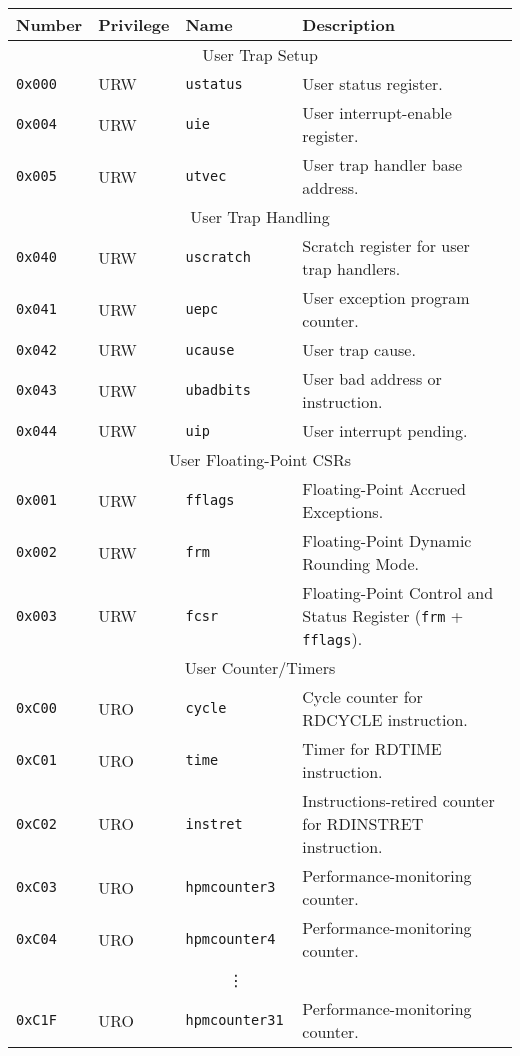 \begin{table}[htb!]
\begin{center}
\begin{tabular}{|l|l|l|l|}
\hline
Number    & Privilege & Name & Description \\
\hline
\multicolumn{4}{|c|}{User Trap Setup} \\
\hline
\tt 0x000 & URW  &\tt ustatus    & User status register. \\
\tt 0x004 & URW  &\tt uie        & User interrupt-enable register. \\
\tt 0x005 & URW  &\tt utvec      & User trap handler base address. \\
\hline
\multicolumn{4}{|c|}{User Trap Handling} \\
\hline
\tt 0x040 & URW  &\tt uscratch   & Scratch register for user trap handlers. \\
\tt 0x041 & URW  &\tt uepc       & User exception program counter. \\
\tt 0x042 & URW  &\tt ucause     & User trap cause. \\
\tt 0x043 & URW  &\tt ubadbits   & User bad address or instruction. \\
\tt 0x044 & URW  &\tt uip        & User interrupt pending. \\
\hline
\multicolumn{4}{|c|}{User Floating-Point CSRs} \\
\hline
\tt 0x001 & URW  &\tt fflags     & Floating-Point Accrued Exceptions. \\
\tt 0x002 & URW  &\tt frm        & Floating-Point Dynamic Rounding Mode. \\
\tt 0x003 & URW  &\tt fcsr       & Floating-Point Control and Status
Register ({\tt frm} + {\tt fflags}). \\
\hline
\multicolumn{4}{|c|}{User Counter/Timers} \\
\hline
\tt 0xC00 & URO  &\tt cycle         & Cycle counter for RDCYCLE instruction. \\
\tt 0xC01 & URO  &\tt time          & Timer for RDTIME instruction. \\
\tt 0xC02 & URO  &\tt instret       & Instructions-retired counter for RDINSTRET instruction. \\
\tt 0xC03 & URO  &\tt hpmcounter3   & Performance-monitoring counter. \\
\tt 0xC04 & URO  &\tt hpmcounter4   & Performance-monitoring counter. \\
& & \multicolumn{1}{c|}{\vdots} & \ \\
\tt 0xC1F & URO  &\tt hpmcounter31  & Performance-monitoring counter. \\

\end{tabular}
\end{center}
\end{table}
